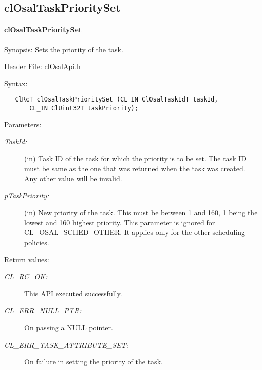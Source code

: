 \subsection{clOsalTaskPrioritySet}
\hypertarget{pageosal108}{}\paragraph{cl\-Osal\-Task\-Priority\-Set}\label{pageosal108}
\begin{Desc}
\item[Synopsis:]Sets the priority of the task.\end{Desc}
\begin{Desc}
\item[Header File:]clOsalApi.h\end{Desc}
\begin{Desc}
\item[Syntax:]

\footnotesize\begin{verbatim}   ClRcT clOsalTaskPrioritySet (CL_IN ClOsalTaskIdT taskId,
       CL_IN ClUint32T taskPriority);
\end{verbatim}
\normalsize
\end{Desc}
\begin{Desc}
\item[Parameters:]
\begin{description}
\item[{\em Task\-Id:}](in) Task ID of the task for which the priority is to be set. The task ID must be same as the one that was returned when the task 
was created. Any other value will be invalid.\item[{\em p\-Task\-Priority:}](in) New priority of the task. This must be between 1 and 160, 1 being the lowest and 160 highest priority. This parameter is ignored for CL\_\-OSAL\_\-SCHED\_\-OTHER. It applies only for the other scheduling policies.\end{description}
\end{Desc}
\begin{Desc}
\item[Return values:]
\begin{description}
\item[{\em CL\_\-RC\_\-OK:}]This API executed successfully. \item[{\em CL\_\-ERR\_\-NULL\_\-PTR:}]On passing a NULL pointer. \item[{\em CL\_\-ERR\_\-TASK\_\-ATTRIBUTE\_\-SET:}]On failure in setting the priority of the task.\end{description}
\end{Desc}

